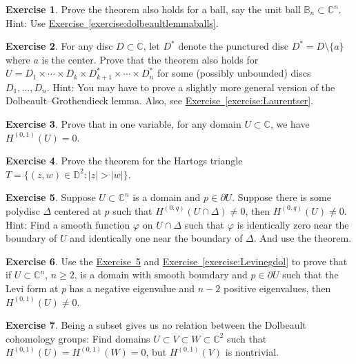 \documentclass[12pt,openany]{book}
\newcommand{\sabs}[1]{\lvert {#1} \rvert}
\newcommand{\C}{{\mathbb{C}}}
\newcommand{\D}{{\mathbb{D}}}
\newcommand{\bB}{{\mathbb{B}}}
\theoremstyle{plain}
\theoremstyle{remark}
\theoremstyle{definition}
\newenvironment{exbox}{%
    \def\FrameCommand{\vrule width 1pt \relax\hspace{10pt}}%
    \MakeFramed{\advance\hsize-\width\FrameRestore}%
}{%
    \endMakeFramed
}
\theoremstyle{exercise}
\newtheorem{exercise}{Exercise}[section]
\theoremstyle{example}
\newcommand{\exerciseref}[1]{\hyperref[#1]{Exercise~\ref*{#1}}}
\begin{document}
\begin{exbox}
\begin{exercise}
Prove the theorem also holds for a ball, say the unit ball $\bB_n \subset
\C^n$.  Hint: Use \exerciseref{exercise:dolbeaultlemmaballs}.
\end{exercise}

\begin{exercise}
For any disc $D \subset \C$, let $D^*$ denote the punctured disc
$D^* = D \setminus \{ a \}$ where $a$ is the center.
Prove that the theorem also holds for
$U = D_1 \times \cdots \times D_k \times D_{k+1}^* \times
\cdots \times D_n^*$ for some (possibly unbounded) discs
$D_1,\ldots,D_n$.
Hint: You may have to prove a slightly more general version of the
Dolbeault--Grothendieck lemma.
Also, see \exerciseref{exercise:Laurentser}.
\end{exercise}

\begin{exercise}
Prove that in one variable, for any domain $U \subset \C$, we have
$H^{(0,1)}(U) = 0$.
\end{exercise}

\begin{exercise}
Prove the theorem for the Hartogs triangle
$T = \bigl\{ (z,w) \in \D^{2} : \sabs{z} > \sabs{w} \bigr\}$.
\end{exercise}

\begin{exercise} \label{exercise:dollocal}
Suppose $U \subset \C^n$ is a domain and $p \in \partial U$.  Suppose there
is some polydisc $\Delta$ centered at $p$ such that
$H^{(0,q)}(U \cap \Delta) \not= 0$, then $H^{(0,q)}(U) \not= 0$.
Hint:  Find a smooth function $\varphi$ on $U \cap \Delta$ such that
$\varphi$ is identically zero near the boundary of $U$ and identically one
near the boundary of $\Delta$.  And use the theorem.
\end{exercise}

\begin{exercise}
Use the \exerciseref{exercise:dollocal} and
\exerciseref{exercise:Levinegdol} to prove that if
$U \subset \C^n$, $n \geq 2$, is a domain with smooth boundary and $p \in \partial U$
such that the Levi form at $p$ has a negative eigenvalue and $n-2$ positive
eigenvalues, then $H^{(0,1)}(U) \not= 0$.
\end{exercise}

\begin{exercise}
Being a subset gives us no relation between the Dolbeault
cohomology groups:  Find domains $U \subset V \subset W \subset \C^2$
such that
$H^{(0,1)}(U) = H^{(0,1)}(W) = 0$, but $H^{(0,1)}(V)$ is nontrivial.
\end{exercise}
\end{exbox}
\end{document}
